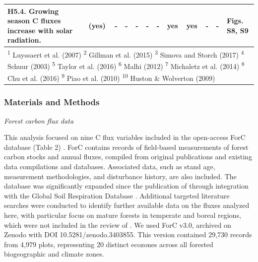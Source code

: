 \documentclass[
]{article}
\begin{document}
\begin{landscape}
\begin{table}[!h]
{\begin{tabular}[t]{llllllllllll}
\hspace{1em}H5.4. Growing season C fluxes increase with solar radiation. & (yes) & - & - & - & - & - & yes & yes & - & - & Figs. S8, S9\\
\bottomrule
\multicolumn{12}{l}{\textsuperscript{1} Luyssaert et al. (2007) \textsuperscript{2} Gillman et al. (2015) \textsuperscript{3} Simova and Storch (2017) \textsuperscript{4} Schuur (2003) \textsuperscript{5} Taylor et al. (2016) \textsuperscript{6} Malhi (2012) \textsuperscript{7} Michaletz et al. (2014) \textsuperscript{8} Chu et al. (2016) \textsuperscript{9} Piao et al. (2010) \textsuperscript{10} Huston \& Wolverton (2009)}\\
\end{tabular}}
\end{table}
\end{landscape}

\hypertarget{materials-and-methods}{%
\subsubsection{Materials and Methods}\label{materials-and-methods}}

\emph{Forest carbon flux data}

This analysis focused on nine C flux variables included in the
open-access ForC database (Table 2)
\citep{anderson-teixeira_carbon_2016, anderson-teixeira_forc_2018}. ForC
contains records of field-based measurements of forest carbon stocks and
annual fluxes, compiled from original publications and existing data
compilations and databases. Associated data, such as stand age,
measurement methodologies, and disturbance history, are also included.
The database was significantly expanded since the publication of
\citet{anderson-teixeira_forc_2018} through integration with the Global
Soil Respiration Database \citep{bond-lamberty_global_2010}. Additional
targeted literature searches were conducted to identify further
available data on the fluxes analyzed here, with particular focus on
mature forests in temperate and boreal regions, which were not included
in the review of \citet{anderson-teixeira_carbon_2016}. We used ForC
v3.0, archived on Zenodo with DOI 10.5281/zenodo.3403855. This version
contained 29,730 records from 4,979 plots, representing 20 distinct
ecozones across all forested biogeographic and climate zones.
\end{document}
